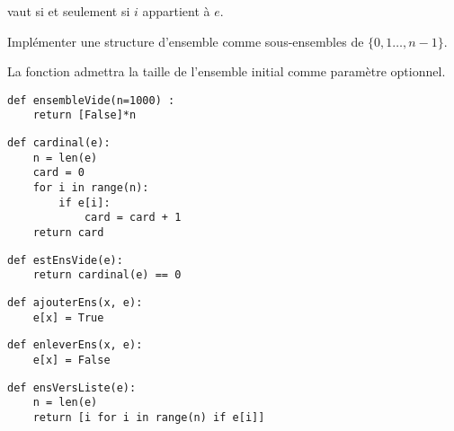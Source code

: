  vaut  si et seulement si $i$ appartient à $e$.
\begin{Exercise}[title = {Ensemble avec des tableaux de booléens}]\it

Implémenter une structure d'ensemble comme sous-ensembles de $\{0,1\ldots,n-1\}$.

La fonction  admettra la taille de l'ensemble initial comme paramètre optionnel.
\end{Exercise} 
\begin{Answer}
\begin{lstlisting}
def ensembleVide(n=1000) :
    return [False]*n
\end{lstlisting}

\begin{lstlisting}
def cardinal(e):
    n = len(e)
    card = 0
    for i in range(n):
        if e[i]:
            card = card + 1
    return card
\end{lstlisting}

\begin{lstlisting}
def estEnsVide(e):
    return cardinal(e) == 0
\end{lstlisting}

\begin{lstlisting}
def ajouterEns(x, e):
    e[x] = True
\end{lstlisting}

\begin{lstlisting}
def enleverEns(x, e):
    e[x] = False
\end{lstlisting}

\begin{lstlisting}
def ensVersListe(e):
    n = len(e)
    return [i for i in range(n) if e[i]]
\end{lstlisting}
\end{Answer}

\newpage
